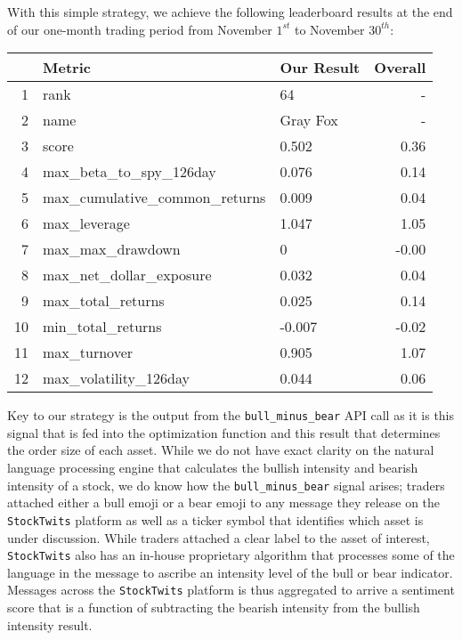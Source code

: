 \documentclass[11pt,]{article}
\begin{document}
With this simple strategy, we achieve the following leaderboard results
at the end of our one-month trading period from November \(1^{st}\) to
November \(30^{th}\):

\begin{table}[ht]
\small
\centering
\begin{tabular}{rllr}
  \hline
 & Metric & Our Result & Overall \\ 
  \hline
1 & rank & 64 & - \\ 
  2 & name & Gray Fox & - \\ 
  3 & score & 0.502 & 0.36 \\ 
  4 & max\_beta\_to\_spy\_126day & 0.076 & 0.14 \\ 
  5 & max\_cumulative\_common\_returns & 0.009 & 0.04 \\ 
  6 & max\_leverage & 1.047 & 1.05 \\ 
  7 & max\_max\_drawdown & 0 & -0.00 \\ 
  8 & max\_net\_dollar\_exposure & 0.032 & 0.04 \\ 
  9 & max\_total\_returns & 0.025 & 0.14 \\ 
  10 & min\_total\_returns & -0.007 & -0.02 \\ 
  11 & max\_turnover & 0.905 & 1.07 \\ 
  12 & max\_volatility\_126day & 0.044 & 0.06 \\ 
   \hline
\end{tabular}
\end{table}

Key to our strategy is the output from the \texttt{bull\_minus\_bear}
API call as it is this signal that is fed into the optimization function
and this result that determines the order size of each asset. While we
do not have exact clarity on the natural language processing engine that
calculates the bullish intensity and bearish intensity of a stock, we do
know how the \texttt{bull\_minus\_bear} signal arises; traders attached
either a bull emoji or a bear emoji to any message they release on the
\texttt{StockTwits} platform as well as a ticker symbol that identifies
which asset is under discussion. While traders attached a clear label to
the asset of interest, \texttt{StockTwits} also has an in-house
proprietary algorithm that processes some of the language in the message
to ascribe an intensity level of the bull or bear indicator. Messages
across the \texttt{StockTwits} platform is thus aggregated to arrive a
sentiment score that is a function of subtracting the bearish intensity
from the bullish intensity result.
\end{document}
